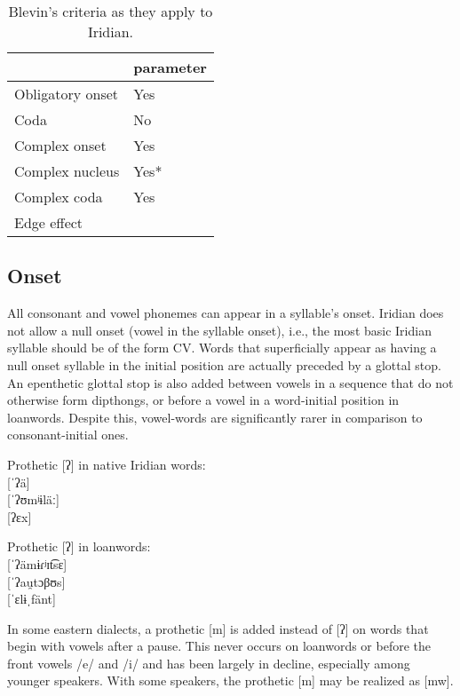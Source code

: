 \begin{table}
	\small
	\caption{Blevin's criteria as they apply to Iridian.}
	\medskip
	\begin{tabularx}{0.6\textwidth}{@{}YM@{}}
		\toprule
		& {\sc parameter}\\
		\midrule
		Obligatory onset & Yes\\
		Coda & No\\
		Complex onset & Yes\\
		Complex nucleus & Yes*\\
		Complex coda & Yes\\
		Edge effect & \\
		\bottomrule
	\end{tabularx}
\end{table}


\subsection{Onset}

\par All consonant and vowel phonemes can appear in a syllable's onset. Iridian
does not allow a null onset (vowel in the syllable onset), i.e., the most basic
Iridian syllable should be of the form CV. Words that superficially appear as
having a null onset syllable in the initial position are actually preceded by a
glottal stop. An epenthetic glottal stop is also added between vowels in a
sequence that do not otherwise form dipthongs, or before a vowel in a
word-initial position in loanwords. Despite this, vowel-words are significantly
rarer in comparison to consonant-initial ones.

\ex
Prothetic [ʔ] in native Iridian words:\\
 [ˈʔä]\\
 [ˈʔʊmʲɨläː]\\
 [ʔɛx]
\xe

\ex
Prothetic [ʔ] in loanwords:\\
 [ˈʔämɨɾʲɪt͡sɛ]\\
 [ˈʔau̯tɔβʊs] \\
 [ˈɛlɨˌfänt]
\xe

In some eastern dialects, a prothetic [m] is added instead of [ʔ] on words that
begin with vowels after a pause. This never occurs on loanwords or before the
front vowels /e/ and /i/ and has been largely in decline, especially among
younger speakers. With some speakers, the prothetic [m] may be realized as [mw].

